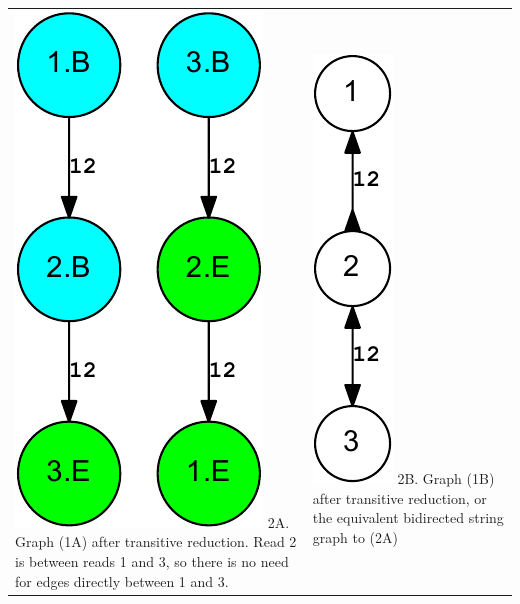 \documentclass[letterpaper,12pt]{article}
\begin{document}
\begin{tabular}{|p{}|p{}|}
\includegraphics[scale=0.6]{out.reduced.digraph-crop.pdf}
\newline 2A. Graph (1A) after transitive reduction.  Read 2 is between reads 1
and 3, so there is no need for edges directly between 1 and 3.
&
\includegraphics[scale=0.6]{out.reduced.bidigraph-crop.pdf}
\newline 2B. Graph (1B) after transitive reduction, or the equivalent bidirected
string graph to (2A)


\end{tabular}
\end{document}
